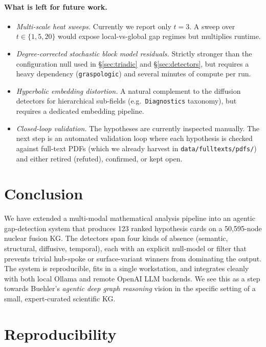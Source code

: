 \documentclass[11pt,a4paper]{article}
\newcommand{\code}[1]{\texttt{\small #1}}
\begin{document}
\paragraph{What is left for future work.}
\begin{itemize}
\item \emph{Multi-scale heat sweeps.} Currently we report only $t=3$. A sweep over $t\in\{1,5,20\}$ would expose local-vs-global gap regimes but multiplies runtime.
\item \emph{Degree-corrected stochastic block model residuals.} Strictly stronger than the configuration null used in \S\ref{sec:triadic} and \S\ref{sec:detectors}, but requires a heavy dependency (\code{graspologic}) and several minutes of compute per run.
\item \emph{Hyperbolic embedding distortion.} A natural complement to the diffusion detectors for hierarchical sub-fields (e.g.\ \code{Diagnostics} taxonomy), but requires a dedicated embedding pipeline.
\item \emph{Closed-loop validation.} The hypotheses are currently inspected manually. The next step is an automated validation loop where each hypothesis is checked against full-text PDFs (which we already harvest in \code{data/fulltexts/pdfs/}) and either retired (refuted), confirmed, or kept open.
\end{itemize}

\section{Conclusion}
\label{sec:conclusion}

We have extended a multi-modal mathematical analysis pipeline into an agentic gap-detection system that produces 123 ranked hypothesis cards on a 50{,}595-node nuclear fusion KG. The detectors span four kinds of absence (semantic, structural, diffusive, temporal), each with an explicit null-model or filter that prevents trivial hub-spoke or surface-variant winners from dominating the output. The system is reproducible, fits in a single workstation, and integrates cleanly with both local Ollama and remote OpenAI LLM backends. We see this as a step towards Buehler's \emph{agentic deep graph reasoning} vision in the specific setting of a small, expert-curated scientific KG.

\section*{Reproducibility}
\end{document}
